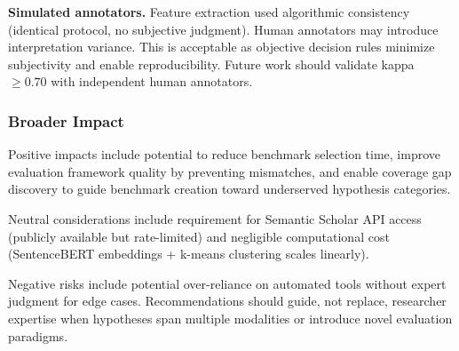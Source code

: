 \textbf{Simulated annotators.} Feature extraction used algorithmic consistency (identical protocol, no subjective judgment). Human annotators may introduce interpretation variance. This is acceptable as objective decision rules minimize subjectivity and enable reproducibility. Future work should validate kappa $\geq 0.70$ with independent human annotators.

\subsubsection{Broader Impact}

Positive impacts include potential to reduce benchmark selection time, improve evaluation framework quality by preventing mismatches, and enable coverage gap discovery to guide benchmark creation toward underserved hypothesis categories.

Neutral considerations include requirement for Semantic Scholar API access (publicly available but rate-limited) and negligible computational cost (SentenceBERT embeddings + k-means clustering scales linearly).

Negative risks include potential over-reliance on automated tools without expert judgment for edge cases. Recommendations should guide, not replace, researcher expertise when hypotheses span multiple modalities or introduce novel evaluation paradigms.
